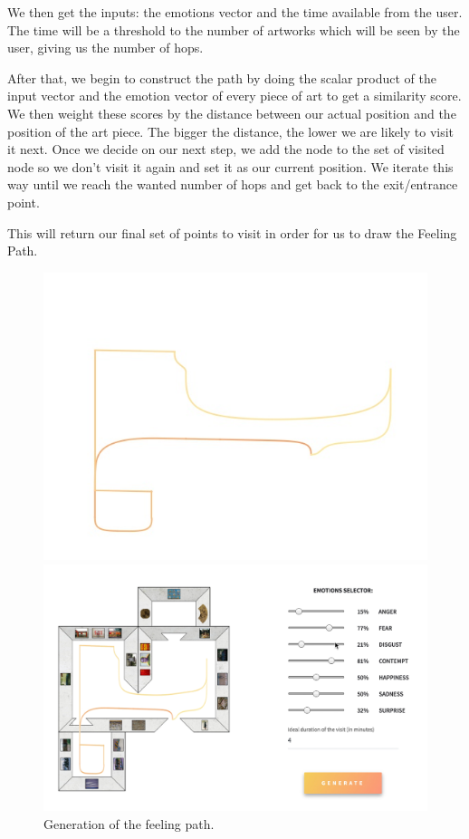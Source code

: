 \documentclass[journal, a4paper]{IEEEtran}
\begin{document}
We then get the inputs: the emotions vector and the time available from the user. The time will be a threshold to the number of artworks which will be seen by the user, giving us the number of hops.

After that, we begin to construct the path by doing the scalar product of the input vector and the emotion vector of every piece of art to get a similarity score. We then weight these scores by the distance between our actual position and the position of the art piece. The bigger the distance, the lower we are likely to visit it next. Once we decide on our next step, we add the node to the set of visited node so we don't visit it again and set it as our current position. We iterate this way until we reach the wanted number of hops and get back to the exit/entrance point.

This will return our final set of points to visit in order for us to draw the Feeling Path.


\begin{figure}[!h]
  \centering
  \begin{minipage}[b]{0.23\textwidth}
    \includegraphics[width=\textwidth]{sPath.jpg}
  \end{minipage}
  \hfill
  \begin{minipage}[b]{0.25\textwidth}
    \includegraphics[width=\textwidth]{patherino.jpg}
  \end{minipage}
  \caption{Generation of the feeling path.}
  \label{fig:path}
\end{figure}
\end{document}
